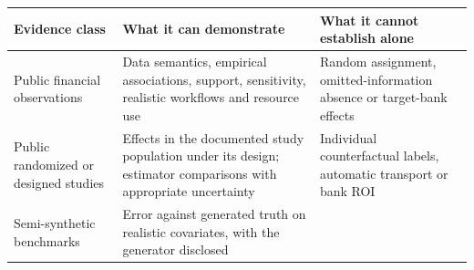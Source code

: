 \begin{longtable}[]{@{}>{\raggedright\arraybackslash}p{}>{\raggedright\arraybackslash}p{}>{\raggedright\arraybackslash}p{}@{}}
\toprule
\begin{minipage}[b]{\linewidth}\raggedright
Evidence class\strut
\end{minipage} & \begin{minipage}[b]{\linewidth}\raggedright
What it can demonstrate\strut
\end{minipage} & \begin{minipage}[b]{\linewidth}\raggedright
What it cannot establish alone\strut
\end{minipage}\tabularnewline
\midrule
\endhead
\begin{minipage}[t]{\linewidth}\raggedright
Public financial observations\strut
\end{minipage} & \begin{minipage}[t]{\linewidth}\raggedright
Data semantics, empirical associations, support, sensitivity, realistic
workflows and resource use\strut
\end{minipage} & \begin{minipage}[t]{\linewidth}\raggedright
Random assignment, omitted-information absence or target-bank
effects\strut
\end{minipage}\tabularnewline
\begin{minipage}[t]{\linewidth}\raggedright
Public randomized or designed studies\strut
\end{minipage} & \begin{minipage}[t]{\linewidth}\raggedright
Effects in the documented study population under its design; estimator
comparisons with appropriate uncertainty\strut
\end{minipage} & \begin{minipage}[t]{\linewidth}\raggedright
Individual counterfactual labels, automatic transport or bank ROI\strut
\end{minipage}\tabularnewline
\begin{minipage}[t]{\linewidth}\raggedright
Semi-synthetic benchmarks\strut
\end{minipage} & \begin{minipage}[t]{\linewidth}\raggedright
Error against generated truth on realistic covariates, with the
generator disclosed\strut
\end{minipage} & \begin{minipage}[t]{\linewidth}\raggedright

\end{minipage}
\end{longtable}
